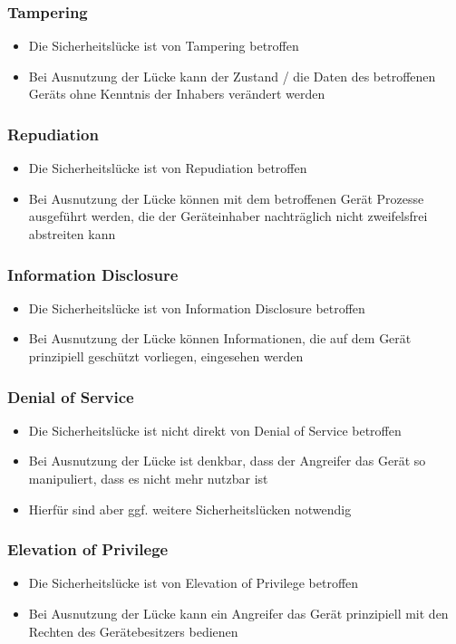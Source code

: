 \documentclass{beamer}
\begin{document}
\begin{frame}
\frametitle{Tampering}
\begin{itemize}
    \item Die Sicherheitslücke ist von Tampering betroffen
    \item Bei Ausnutzung der Lücke kann der Zustand / die Daten des betroffenen
    Geräts ohne Kenntnis der Inhabers verändert werden
\end{itemize}
\end{frame}

\begin{frame}
\frametitle{Repudiation}
\begin{itemize}
    \item Die Sicherheitslücke ist von Repudiation betroffen
    \item Bei Ausnutzung der Lücke können mit dem betroffenen Gerät Prozesse
    ausgeführt werden, die der Geräteinhaber nachträglich nicht zweifelsfrei
    abstreiten kann
\end{itemize}
\end{frame}

\begin{frame}
\frametitle{Information Disclosure}
\begin{itemize}
    \item Die Sicherheitslücke ist von Information Disclosure betroffen
    \item Bei Ausnutzung der Lücke können Informationen, die auf dem Gerät
    prinzipiell geschützt vorliegen, eingesehen werden
\end{itemize}
\end{frame}

\begin{frame}
\frametitle{Denial of Service}
\begin{itemize}
    \item Die Sicherheitslücke ist nicht direkt von Denial of Service betroffen
    \item Bei Ausnutzung der Lücke ist denkbar, dass der Angreifer das Gerät so
    manipuliert, dass es nicht mehr nutzbar ist
    \item Hierfür sind aber ggf. weitere Sicherheitslücken notwendig
\end{itemize}
\end{frame}

\begin{frame}
\frametitle{Elevation of Privilege}
\begin{itemize}
    \item Die Sicherheitslücke ist von Elevation of Privilege betroffen
    \item Bei Ausnutzung der Lücke kann ein Angreifer das Gerät prinzipiell mit
    den Rechten des Gerätebesitzers bedienen
\end{itemize}
\end{frame}
\end{document}
